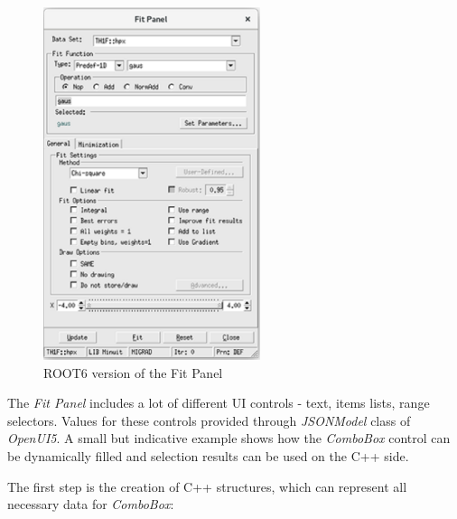 \documentclass[a4paper]{jpconf}
\begin{document}
\begin{figure}[h]
\begin{minipage}{14pc}
\includegraphics[width=15pc]{oldPanel.eps}
\caption{\label{label}ROOT6 version of the Fit Panel}
\end{minipage}
\end{figure}

The \textit{Fit Panel} includes a lot of different UI controls - text, items lists, range selectors.
Values for these controls provided through \textit{JSONModel} class of \textit{OpenUI5}.
A small but indicative example shows how the \textit{ComboBox} control can be dynamically filled and selection results can be used on the C++ side.

The first step is the creation of C++ structures, which can represent all necessary data for \textit{ComboBox}:
\end{document}
